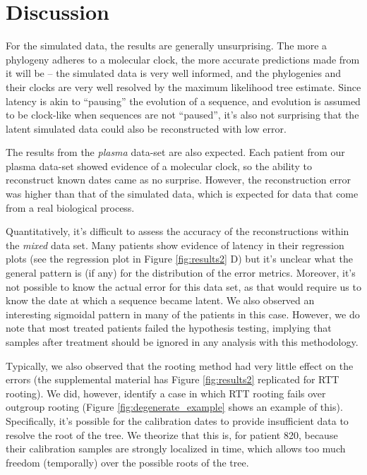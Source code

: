 \section{Discussion} \label{sec:discuss}
For the simulated data, the results are generally unsurprising. 
The more a phylogeny adheres to a molecular clock, the more accurate predictions made from it will be -- the simulated data is very well informed, and the phylogenies and their clocks are very well resolved by the maximum likelihood tree estimate. 
Since latency is akin to ``pausing'' the evolution of a sequence, and evolution is assumed to be clock-like when sequences are not ``paused'', it's also not surprising that the latent simulated data could also be reconstructed with low error. 

The results from the {\em plasma} data-set are also expected. 
Each patient from our plasma data-set showed evidence of a molecular clock, so the ability to reconstruct known dates came as no surprise. 
However, the reconstruction error was higher than that of the simulated data, which is expected for data that come from a real biological process.

Quantitatively, it's difficult to assess the accuracy of the reconstructions within the {\em mixed} data set. 
Many patients show evidence of latency in their regression plots (see the regression plot in Figure \ref{fig:results2} D) but it's unclear what the general pattern is (if any) for the distribution of the error metrics. 
Moreover, it's not possible to know the actual error for this data set, as that would require us to know the date at which a sequence became latent. 
We also observed an interesting sigmoidal pattern in many of the patients in this case.
However, we do note that most treated patients failed the hypothesis testing, implying that samples after treatment should be ignored in any analysis with this methodology.

Typically, we also observed that the rooting method had very little effect on the errors (the supplemental material has Figure \ref{fig:results2} replicated for RTT rooting). 
We did, however, identify a case in which RTT rooting fails over outgroup rooting (Figure \ref{fig:degenerate_example} shows an example of this). 
Specifically, it's possible for the calibration dates to provide insufficient data to resolve the root of the tree. 
We theorize that this is, for patient 820, because their calibration samples are strongly localized in time, which allows too much freedom (temporally) over the possible roots of the tree. 

